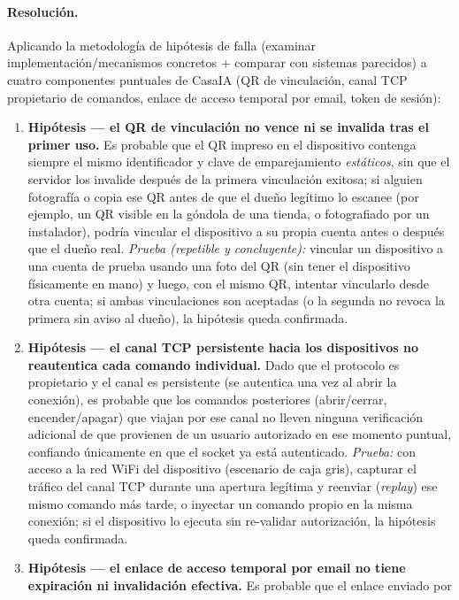 \paragraph{Resolución.}
Aplicando la metodología de hipótesis de falla (examinar implementación/mecanismos
concretos + comparar con sistemas parecidos) a cuatro componentes puntuales de
CasaIA (QR de vinculación, canal TCP propietario de comandos, enlace de acceso
temporal por email, token de sesión):

\begin{enumerate}
  \item \textbf{Hipótesis --- el QR de vinculación no vence ni se invalida tras el
  primer uso.} Es probable que el QR impreso en el dispositivo contenga siempre el
  mismo identificador y clave de emparejamiento \emph{estáticos}, sin que el
  servidor los invalide después de la primera vinculación exitosa; si alguien
  fotografía o copia ese QR antes de que el dueño legítimo lo escanee (por ejemplo,
  un QR visible en la góndola de una tienda, o fotografiado por un instalador),
  podría vincular el dispositivo a su propia cuenta antes o después que el dueño
  real. \emph{Prueba (repetible y concluyente):} vincular un dispositivo a una
  cuenta de prueba usando una foto del QR (sin tener el dispositivo físicamente en
  mano) y luego, con el mismo QR, intentar vincularlo desde otra cuenta; si ambas
  vinculaciones son aceptadas (o la segunda no revoca la primera sin aviso al
  dueño), la hipótesis queda confirmada.
  \item \textbf{Hipótesis --- el canal TCP persistente hacia los dispositivos no
  reautentica cada comando individual.} Dado que el protocolo es propietario y el
  canal es persistente (se autentica una vez al abrir la conexión), es probable que
  los comandos posteriores (abrir/cerrar, encender/apagar) que viajan por ese canal
  no lleven ninguna verificación adicional de que provienen de un usuario
  autorizado en ese momento puntual, confiando únicamente en que el socket ya está
  autenticado. \emph{Prueba:} con acceso a la red WiFi del dispositivo (escenario
  de caja gris), capturar el tráfico del canal TCP durante una apertura legítima y
  reenviar (\emph{replay}) ese mismo comando más tarde, o inyectar un comando
  propio en la misma conexión; si el dispositivo lo ejecuta sin re-validar
  autorización, la hipótesis queda confirmada.
  \item \textbf{Hipótesis --- el enlace de acceso temporal por email no tiene
  expiración ni invalidación efectiva.} Es probable que el enlace enviado por

\end{enumerate}
